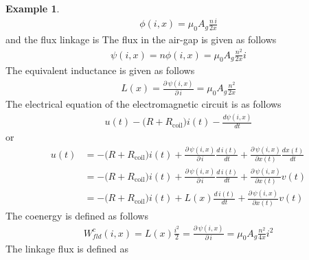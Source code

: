 \documentclass[11pt,a4paper,oneside]{book}
\numberwithin{equation}{section}
\theoremstyle{it}
\theoremstyle{definition}
\newtheorem{example}{Example}[section]
\begin{document}
\begin{example}
\begin{equation}\label{example_6}	
	\begin{aligned}
		\phi\left(i,x\right) = \mu_0A_g\frac{n\,i}{2x} 
	\end{aligned}
\end{equation} 
and the flux linkage is 
The flux in the air-gap is given as follows
\begin{equation}\label{example_7}	
	\begin{aligned}
		\psi\left(i,x\right) = n\phi\left(i,x\right) = \mu_0A_g\frac{n^2}{2x}i 
	\end{aligned}
\end{equation}
The equivalent inductance is given as follows
\begin{equation}\label{example_8}	
	\begin{aligned}
		L(x) = \frac{\partial\,\psi\left(i,x\right)}{\partial\,i} = \mu_0A_g\frac{n^2}{2x} 
	\end{aligned}
\end{equation}
The electrical equation of the electromagnetic circuit is as follows
\begin{equation}\label{example_9}	
	\begin{aligned}
		u(t) - \big(R+R_{\text{coil}}\big)i(t) -\frac{d\psi(i,x)}{dt}
	\end{aligned}
\end{equation}
or
\begin{equation}\label{example_10}	
	\begin{aligned}
		u(t) &= -\big(R+R_{\text{coil}}\big)i(t) + \frac{\partial\,\psi(i,x)}{\partial\,i}\frac{d\,i(t)}{dt} + \frac{\partial\,\psi(i,x)}{\partial x(t)}\frac{dx(t)}{dt} \\[8pt]
		&= -\big(R+R_{\text{coil}}\big)i(t) + \frac{\partial\,\psi(i,x)}{\partial\,i}\frac{d\,i(t)}{dt} + \frac{\partial\,\psi(i,x)}{\partial x(t)}v(t) \\[8pt]
		&= -\big(R+R_{\text{coil}}\big)i(t) + L(x)\frac{d\,i(t)}{dt} + \frac{\partial\,\psi(i,x)}{\partial x(t)}v(t)
	\end{aligned}
\end{equation}
The coenergy is defined as follows
\begin{equation}\label{example_11}	
	\begin{aligned}
		W_{fld}^c(i,x)=L(x)\frac{i^2}{2} = \frac{\partial\,\psi\left(i,x\right)}{\partial\,i} = \mu_0A_g\frac{n^2}{4x} i^2
	\end{aligned}
\end{equation}
The linkage flux is defined as

\end{example}
\end{document}
